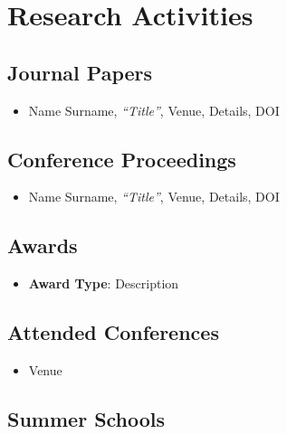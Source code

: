 \cleardoublepage
\chapter*{Research Activities}


\section*{Journal Papers}
\label{sec:cxra:journals}

\begin{itemize}
    \item Name Surname, \textit{``Title''}, Venue, Details, DOI
\end{itemize}


\section*{Conference Proceedings}
\label{sec:cxra:conferencepapers}

\begin{itemize}
    \item Name Surname, \textit{``Title''}, Venue, Details, DOI
\end{itemize}


\section*{Awards}
\label{sec:cxra:awards}

\begin{itemize}
    \item \textbf{Award Type}: Description
\end{itemize}


\section*{Attended Conferences}
\label{sec:cxra:attendedconf}

\begin{itemize}
    \item Venue
\end{itemize}


\section*{Summer Schools}
\label{sec:cxra:summerschools}

